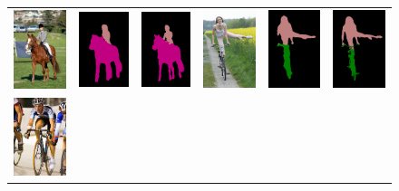 \begin{figure}[!htbp]
{\begin{tabular}{c c c | c c c}
    \includegraphics[height=0.24\linewidth]{fig/img/2007_005331.jpg} &
    \includegraphics[height=0.24\linewidth]{fig/res_none/2007_005331.png} &
    \includegraphics[height=0.24\linewidth]{fig/res_crf/2007_005331.png} &
    \includegraphics[height=0.24\linewidth]{fig/img/2008_004654.jpg} &
    \includegraphics[height=0.24\linewidth]{fig/res_none/2008_004654.png} &
    \includegraphics[height=0.24\linewidth]{fig/res_crf/2008_004654.png} \\
    \includegraphics[height=0.24\linewidth]{fig/img/2007_000129.jpg} &

\end{tabular}}
\end{figure}
